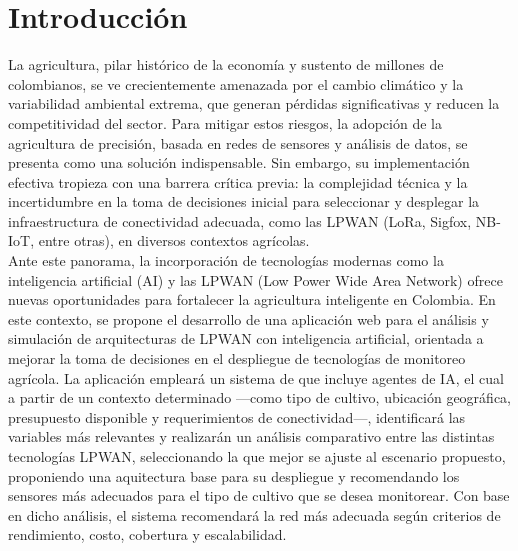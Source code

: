 \chapter{Introducción}
La agricultura, pilar histórico  de  la  economía  y  sustento  de  millones  de
colombianos, se ve  crecientemente  amenazada  por  el  cambio  climático  y  la
variabilidad ambiental extrema, que generan pérdidas significativas y reducen la
competitividad del sector.  Para  mitigar  estos  riesgos,  la  adopción  de  la
agricultura de precisión, basada en redes de sensores y análisis  de  datos,  se
presenta  como  una  solución  indispensable.  Sin  embargo,  su  implementación
efectiva tropieza con una barrera crítica previa: la complejidad  técnica  y  la
incertidumbre en la toma de decisiones inicial para seleccionar y  desplegar  la
infraestructura de conectividad adecuada, como las LPWAN  (LoRa,  Sigfox,
NB-IoT, entre otras), en diversos contextos agrícolas.\\


Ante  este  panorama,  la  incorporación  de  tecnologías   modernas   como   la
inteligencia artificial (AI) y las LPWAN (Low  Power  Wide  Area  Network)
ofrece nuevas  oportunidades  para  fortalecer  la  agricultura  inteligente  en
Colombia. En este contexto, se propone el desarrollo de una aplicación web  para
el análisis y simulación  de  arquitecturas  de  LPWAN  con  inteligencia
artificial, orientada a mejorar la  toma  de  decisiones  en  el  despliegue  de
tecnologías de monitoreo agrícola. La aplicación  empleará  un  sistema  de  que
incluye agentes de IA, el cual a partir de un contexto determinado —como tipo de
cultivo,  ubicación  geográfica,  presupuesto  disponible  y  requerimientos  de
conectividad—,  identificará  las  variables  más  relevantes  y  realizarán  un
análisis comparativo entre las distintas tecnologías LPWAN, seleccionando la que
mejor se ajuste al escenario propuesto, proponiendo una aquitectura base para su
despliegue y recomendando los sensores más adecuados para el tipo de cultivo que
se desea monitorear. Con base en dicho análisis, el sistema recomendará  la  red
más adecuada según criterios de rendimiento, costo, cobertura y escalabilidad.\\

